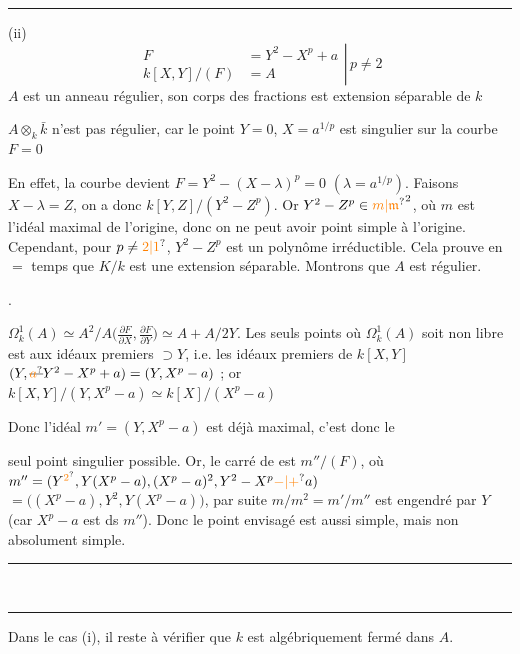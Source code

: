 \noindent\rule{.28\linewidth}{.3pt}

(ii)
\[
\left.
\begin{aligned}
 F&=Y^2-X^p+a\\
 k[X,Y]/(F)&=A
\end{aligned}
\right|\,p\ne2
\]
$A$ est un anneau régulier,  son corps des fractions est extension séparable de $k$

$A\otimes_k\bar k$ n'est pas régulier, car le point $Y=0$, $X=a^{1/p}$ est singulier sur la courbe $F=0$

En effet, la courbe devient $F=Y^2-(X-\lambda)^p=0$ \quad$(\lambda=a^{1/p})$. Faisons $X-\lambda=Z$, on a donc $k[Y,Z]/(Y^2-Z^p)$. Or $Y^2-Z^p\in{\unsure{m|\mathfrak m}}^{2}$, où $m$ est l'idéal maximal de l'origine, donc on ne peut avoir point simple à l'origine. Cependant, pour $p\ne\unsure{2|1}$, $Y^2-Z^p$ est un polynôme irréductible. Cela prouve en $=$ temps que $K/k$ est une extension séparable. Montrons que $A$ est régulier.

  .

$\Omega^1_k(A)\simeq A^2/A\bigl(\frac{\partial F}{\partial X},\frac{\partial F}{\partial Y}\bigr)\simeq A+A/2Y$. Les seuls points où $\Omega^1_k(A)$ soit non libre est aux idéaux premiers $\supset Y$, i.e. les idéaux premiers de $k[X,Y]$  $(Y,\deleted{\unsure{a}}Y^2-X^p+a)=(Y,X^p-a)$ ; or $k[X,Y]/(Y,X^p-a)\simeq k[X]/(X^{p}-a)$

Donc l'idéal $m'=(Y,X^p-a)$ est déjà maximal, c'est donc le


seul point singulier possible. Or, le carré de  est $m''/(F)$,  où $m''=(Y^{\unsure{2}},Y(X^p-a),(X^p-a)^2,Y^2-X^p\unsure{-|+}a)$  $=\bigl((X^p-a),Y^2,Y(X^p-a)\bigr)$, par suite $m/m^2=m'/m''$ est engendré par $Y$ (car $X^p-a$ est ds $m''$). Donc le point envisagé est aussi simple, mais non absolument simple.

\begin{center}\rule{.22\linewidth}{.3pt}\\[-.8ex]\rule{.19\linewidth}{.3pt}\end{center}

Dans le cas (i), il reste à vérifier que $k$ est algébriquement fermé dans $A$.

